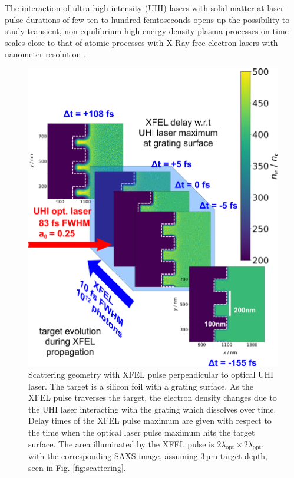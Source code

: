 The interaction of ultra-high intensity (UHI) lasers with solid matter at laser
pulse durations of few ten to hundred femtoseconds opens up the possibility to
study transient, non-equilibrium high energy density plasma processes on time
scales close to that of atomic processes with X-Ray free electron lasers with
nanometer resolution \cite{Kluge2016}.

\begin{figure}
\centering
  \includegraphics[width=.95\linewidth]{figures/scattering_geometry_v4.png}
\caption{
Scattering geometry with XFEL pulse perpendicular to optical UHI laser. The
target is a silicon foil with a grating surface. As the XFEL pulse traverses the
target, the electron density changes due to the UHI laser interacting with the
grating which dissolves over time. Delay times of the XFEL pulse maximum are
given with respect to the time when the optical laser pulse maximum hits the
target surface.  The area illuminated by the XFEL pulse is
$2\lambda_\mathrm{opt} \times 2\lambda_\mathrm{opt}$, with the corresponding
SAXS image, assuming $3\,\mathrm{µm}$ target depth, seen in Fig.
\ref{fig:scattering}.  }
  \label{fig:density}
\end{figure}

